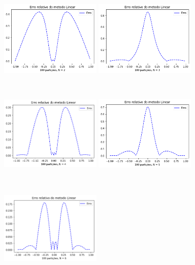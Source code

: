 \documentclass{article}
\begin{document}
\begin{figure}[!htb]
\centering
\includegraphics [width=5cm,height=5cm]{ELb2.png}
\includegraphics [width=5cm,height=5cm]{ELb3.png}
\includegraphics [width=5cm,height=5cm]{ELb4.png}
\includegraphics [width=5cm,height=5cm]{ELb5.png}
\includegraphics [width=5cm,height=5cm]{ELb6.png}

\end{figure}
\end{document}
